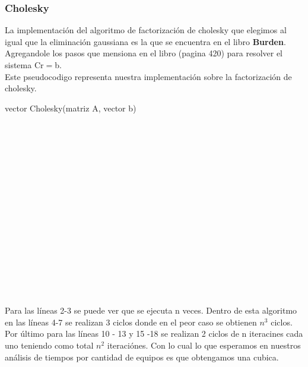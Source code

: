 \newpage
\subsubsection{Cholesky}

La implementación del algoritmo de factorizaci\'on de cholesky que elegimos al igual que la eliminaci\'on gaussiana es la que se encuentra en el libro \textbf{Burden}.
Agregandole los pasos que mensiona en el libro (pagina 420) para resolver el sistema Cr$=$b.\\

Este pseudocodigo representa nuestra implementaci\'on sobre la factorizaci\'on de cholesky.

\begin{algorithm}
    \begin{algorithmic}[1]\parskip=2mm
        \caption{vector Cholesky(matriz A, vector b)}
        \\
        \\
        \\
        \\
        \\
        \\
        \\
        \\
        \\
        \\
        \\
        \\
        \\
        \\
        \\
    \end{algorithmic}
\end{algorithm}
Para las l\'ineas 2-3 se puede ver que se ejecuta n veces.
Dentro de esta algoritmo en las l\'ineas 4-7 se realizan 3 ciclos donde en el peor caso se obtienen $n^3 $ ciclos.
Por \'ultimo para las l\'ineas 10 - 13 y 15 -18 se realizan 2 ciclos de n iteracines cada uno teniendo como total $n^2$ iteraci\'ones.
Con lo cual lo que esperamos en nuestros an\'alisis de tiempos por cantidad de equipos es que obtengamos una cubica.

